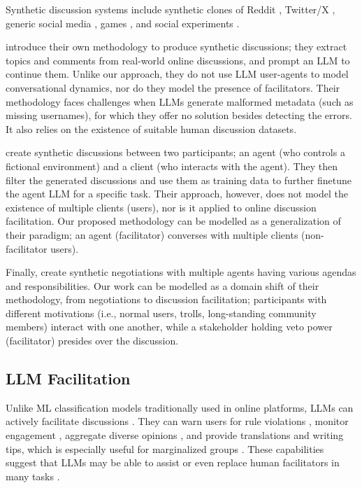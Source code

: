 Synthetic discussion systems include synthetic clones of Reddit \cite{park_simulacra}, Twitter/X \cite{mou_2024}, generic social media \cite{tornberg_2023, y_social}, games \cite{Park2023GenerativeAI}, and social experiments \cite{zhou_2024_sotopia}.

\citet{balog_2024} introduce their own methodology to produce synthetic discussions; they extract topics and comments from real-world online discussions, and prompt an \ac{LLM} to continue them. Unlike our approach, they do not use \ac{LLM} user-agents to model conversational dynamics, nor do they model the presence of facilitators. Their methodology faces challenges when \acp{LLM} generate malformed metadata (such as missing usernames), for which they offer no solution besides detecting the errors. It also relies on the existence of suitable human discussion datasets.

\citet{ulmer2024} create synthetic discussions between two participants; an agent (who controls a fictional environment) and a client (who interacts with the agent). They then filter the generated discussions and use them as training data to further finetune the agent \ac{LLM} for a specific task. Their approach, however, does not model the existence of multiple clients (users), nor is it applied to online discussion facilitation. Our proposed methodology can be modelled as a generalization of their paradigm; an agent (facilitator) converses with multiple clients (non-facilitator users).

Finally, \citet{abdelnabi_negotiations} create synthetic negotiations with multiple agents having various agendas and responsibilities. Our work can be modelled as a domain shift of their methodology, from negotiations to discussion facilitation; participants with different motivations (i.e., normal users, trolls, long-standing community members) interact with one another, while a stakeholder holding veto power (facilitator) presides over the discussion.


\subsection{LLM Facilitation}

Unlike \ac{ML} classification models traditionally used in online platforms, \acp{LLM} can actively facilitate discussions \cite{korre2025evaluation}. They can warn users for rule violations \cite{Kumar_AbuHashem_Durumeric_2024}, monitor engagement \cite{schroeder-etal-2024-fora}, aggregate diverse opinions \cite{small-polis-llm}, and provide translations and writing tips, which is especially useful for marginalized groups \cite{Tsai2024Generative}. These capabilities suggest that \acp{LLM} may be able to assist or even replace human facilitators in many tasks \cite{small-polis-llm, seering_self_moderation}.

